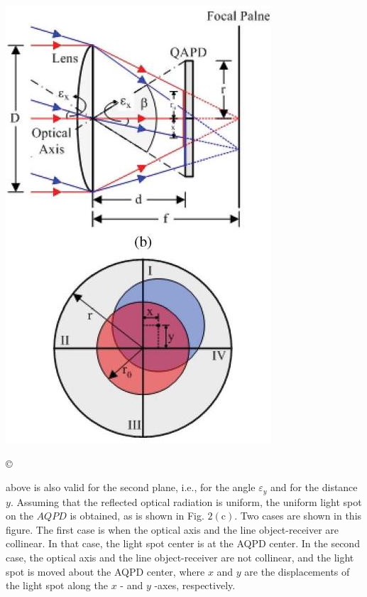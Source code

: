 \documentclass[10pt]{article}
\begin{document}
\includegraphics[max width=\textwidth]{5ecfdecb1168916efbeaf9054b715324-03(1)}

©

above is also valid for the second plane, i.e., for the angle \(\varepsilon_{y}\) and for the distance \(y\). Assuming that the reflected optical radiation is uniform, the uniform light spot on the \(A Q P D\) is obtained, as is shown in Fig. \(2(\mathrm{c})\). Two cases are shown in this figure. The first case is when the optical axis and the line object-receiver are collinear. In that case, the light spot center is at the AQPD center. In the second case, the optical axis and the line object-receiver are not collinear, and the light spot is moved about the AQPD center, where \(x\) and \(y\) are the displacements of the light spot along the \(x\) - and \(y\) -axes, respectively.
\end{document}
